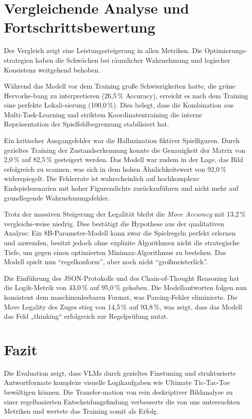 \documentclass[12pt,a4paper]{article}
\begin{document}
	\newpage
	\section{Vergleichende Analyse und Fortschrittsbewertung}
	Der Vergleich zeigt eine Leistungssteigerung in allen Metriken. Die Optimierungs-strategien haben die Schwächen bei räumlicher Wahrnehmung und logischer Konsistenz weitgehend behoben.
	
	\begin{description}[leftmargin=!, labelwidth=1.5cm, style=nextline]
		\item [Räumliche Präzision] Während das Modell vor dem Training große Schwierigkeiten hatte, die grüne Hervorhe-bung zu interpretieren (26,5\,\% Accuracy), erreicht es nach dem Training eine perfekte Lokali-sierung (100,0\,\%). Dies belegt, dass die Kombination aus Multi-Task-Learning und striktem Koordinatentraining die interne Repräsentation der Spielfeldbegrenzung stabilisiert hat.
		
		\item [Perzeptions-Halluzinationen] Ein kritischer Ausgangsfehler war die Halluzination fiktiver Spielfiguren. Durch gezieltes Training der Zustandserkennung konnte die Genauigkeit der Matrix von 2,0\,\% auf 82,5\,\% gesteigert werden. Das Modell war zudem in der Lage, das Bild erfolgreich zu scannen, was sich in dem hohen Ähnlichkeitswert von 92,0\,\% widerspiegelt. Die Fehlerrate ist wahrscheinlich auf hochkomplexe Endspielszenarien mit hoher Figurendichte zurückzuführen und nicht mehr auf grundlegende Wahrnehmungsfehler.
		
		\item [Strategische Tiefe] Trotz der massiven Steigerung der Legalität bleibt die \textit{Move Accuracy} mit 13,2\,\% vergleichs-weise niedrig. Dies bestätigt die Hypothese aus der qualitativen Analyse: Ein 8B-Parameter-Modell kann zwar die Spielregeln perfekt erlernen und anwenden, besitzt jedoch ohne explizite Algorithmen nicht die strategische Tiefe, um gegen einen optimierten Minimax-Algorithmus zu bestehen. Das Modell spielt nun "`regelkonform"', aber noch nicht "`großmeisterlich"'.
		
		\item [JSON Enforcement] Die Einführung des JSON-Protokolls und des Chain-of-Thought Reasoning hat die Logik-Metrik von 43,0\,\%  auf 95,0\,\% gehoben. Die Modellantworten folgen nun konsistent dem maschinenlesbaren Format, was Parsing-Fehler eliminierte. Die Move Legality des Zuges stieg von 14,5\,\% auf 93,8\,\%, was zeigt, dass das Modell das Feld „thinking“ erfolgreich zur Regelprüfung nutzt.
	\end{description}
	
	\section{Fazit}
	Die Evaluation zeigt, dass VLMs durch gezieltes Finetuning und strukturierte Antwortformate komplexe visuelle Logikaufgaben wie Ultimate Tic-Tac-Toe bewältigen können. Die Transfor-mation von rein deskriptiver Bildanalyse zu einer regelbasierten Entscheidungsfindung verbesserte die von uns untersuchten Metriken und wertete das Training somit als Erfolg.
\end{document}
